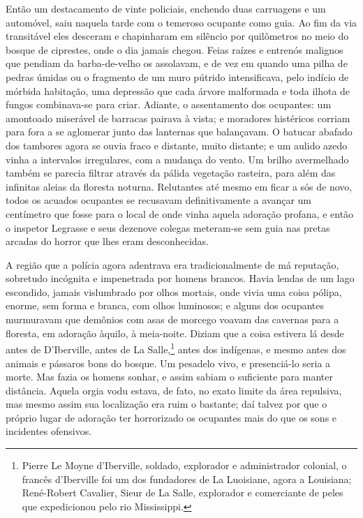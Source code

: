 Então um destacamento de vinte policiais, enchendo duas carruagens e um
automóvel, saiu naquela tarde com o temeroso ocupante como guia. Ao fim
da via transitável eles desceram e chapinharam em silêncio por quilômetros
no meio do bosque de ciprestes, onde o dia jamais chegou. Feias raízes e
entrenós malignos que pendiam da barba-de-velho os assolavam, e de vez
em quando uma pilha de pedras úmidas ou o fragmento de um muro pútrido
intensificava, pelo indício de mórbida habitação, uma depressão que cada
árvore malformada e toda ilhota de fungos combinava-se para criar.
Adiante, o assentamento dos ocupantes: um amontoado miserável de
barracas pairava à vista; e moradores histéricos corriam para fora a se
aglomerar junto das lanternas que balançavam. O batucar abafado dos
tambores agora se ouvia fraco e distante, muito distante; e um aulido
azedo vinha a intervalos irregulares, com a mudança do vento. Um brilho
avermelhado também se parecia filtrar através da pálida vegetação
rasteira, para além das infinitas aleias da floresta noturna. Relutantes
até mesmo em ficar a sós de novo, todos os acuados ocupantes se
recusavam definitivamente a avançar um centímetro que fosse para o local de onde
vinha aquela adoração profana, e então o inspetor Legrasse e seus
dezenove colegas meteram-se sem guia nas pretas arcadas do horror que
lhes eram desconhecidas.

A região que a polícia agora adentrava era tradicionalmente de má
reputação, sobretudo incógnita e impenetrada por homens brancos. Havia
lendas de um lago escondido, jamais vislumbrado por olhos mortais, onde
vivia uma coisa pólipa, enorme, sem forma e branca, com olhos luminosos;
e alguns dos ocupantes murmuravam que demônios com asas de morcego
voavam das cavernas para a floresta, em adoração àquilo, à meia-noite.
Diziam que a coisa estivera lá desde antes de D'Iberville, antes de La
Salle,\footnote{Pierre Le Moyne d'Iberville, soldado,
  explorador e administrador colonial, o francês d'Iberville foi um dos
  fundadores de La Luoisiane, agora a Louisiana; René-Robert Cavalier,
  Sieur de La Salle, explorador e comerciante de peles que
  expedicionou pelo rio Mississippi.} antes dos indígenas, e mesmo antes
dos animais e pássaros bons do bosque. Um pesadelo vivo, e presenciá-lo
seria a morte. Mas fazia os homens sonhar, e assim sabiam o suficiente
para manter distância. Aquela orgia vodu estava, de fato, no exato
limite da área repulsiva, mas mesmo assim sua localização era ruim o
bastante; daí talvez por que o próprio lugar de adoração ter
horrorizado os ocupantes mais do que os sons e incidentes ofensivos.

